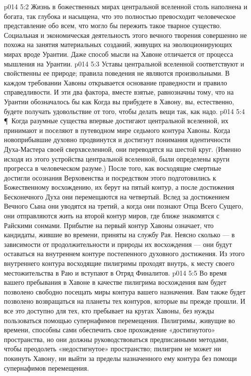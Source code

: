\vs p014 5:2 Жизнь в божественных мирах центральной вселенной столь наполнена и богата, так глубока и насыщена, что это полностью превосходит человеческое представление обо всем, что могло бы пережить такое тварное существо. Социальная и экономическая деятельность этого вечного творения совершенно не похожа на занятия материальных созданий, живущих на эволюционирующих мирах вроде Урантии. Даже способ мысли на Хавоне отличается от процесса мышления на Урантии.
\vs p014 5:3 Уставы центральной вселенной соответствуют и свойственны ее природе; правила поведения не являются произвольными. В каждом требовании Хавоны открывается основание праведности и правило справедливости. И эти два фактора, вместе взятые, равнозначны тому, что на Урантии обозначалось бы как  Когда вы прибудете в Хавону, вы, естественно, будете получать удовольствие от того, чтобы делать вещи так, как надо.
\vs p014 5:4 \P\ Когда разумные существа впервые достигают центральной вселенной, их принимают и поселяют в путеводном мире седьмого контура Хавоны. Когда новоприбывшие духовно продвинутся и достигнут понимания идентичности Духа\hyp{}Мастера своей сверхвселенной, они переводятся на шестой круг. (Именно исходя из этого устройства центральной вселенной, были определены круги прогресса в человеческом разуме.) После того, как восходящие смертные достигли осознания Верховенства и посредством этого подготовились к Божественному восхождению, их берут на пятый контур, а после достижения Бесконечного Духа они перемещаются на четвертый. Вслед за достижением Вечного Сына они уводятся на третий, а когда они познают Отца Всего Сущего, они отправляются жить на второй контур миров, где ближе знакомятся с Райскими сонмами. Прибытие на первый контур Хавоны означает, что кандидаты, жившие во времени, приняты на службу Рая. Неясно сколько --- в зависимости от продолжительности и природы их восхождения --- они будут оставаться на внутреннем контуре постепенного духовного достижения. Из этого внутреннего контура восходящие пилигримы проходят внутрь, к месту своего местожительства в Раю и вступают в Отряд Финалитов.
\vs p014 5:5 Во время вашего пребывания в Хавоне в качестве пилигрима восхождения вам будет позволено свободно посещать миры контура вашего назначения. Вам также будет позволено возвращаться на планеты тех контуров, которые вы прежде прошли. И все это доступно для тех, кто пребывает на кругах Хавоны, без нужды пользоваться помощью супернафимов перемещения. Пилигримы, живущие во времени, способны сами обеспечить свое прохождение «достигнутого» пространства, но они должны руководствоваться предписанными методами, чтобы преодолеть «недостигнутое» пространство; пилигрим не может ни покинуть Хавону, ни выйти за пределы назначенного ему контура без помощи супернафимов перемещения.
